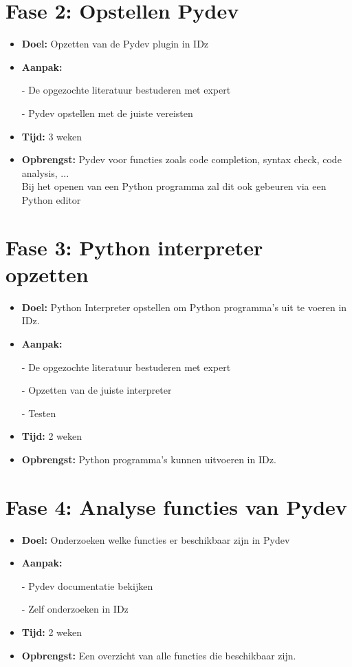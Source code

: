 \section{Fase 2: Opstellen Pydev}
\label{sec:m-opstellen-pydev}
\begin{itemize}
    \item \textbf{Doel:}
    Opzetten van de Pydev plugin in IDz
    \item \textbf{Aanpak:}
    \item[-] De opgezochte literatuur bestuderen met expert
    \item[-] Pydev opstellen met de juiste vereisten
    \item \textbf{Tijd:} 3 weken
    \item \textbf{Opbrengst:}
    Pydev voor functies zoals code completion, syntax check, code analysis, ... \\ 
    Bij het openen van een Python programma zal dit ook gebeuren via een Python editor
\end{itemize}


\section{Fase 3: Python interpreter opzetten}
\label{sec:m-python-interpreter-opzetten}
\begin{itemize}
    \item \textbf{Doel:}
    Python Interpreter opstellen om Python programma's uit te voeren in IDz.
    \item \textbf{Aanpak:}
    \item[-] De opgezochte literatuur bestuderen met expert
    \item[-] Opzetten van de juiste interpreter
    \item[-] Testen
    
    \item \textbf{Tijd:} 2 weken
    \item \textbf{Opbrengst:}
    Python programma's kunnen uitvoeren in IDz.
\end{itemize}


\section{Fase 4: Analyse functies van Pydev}
\label{sec:m-verdere-configuratie}
\begin{itemize}
    \item \textbf{Doel:}
    Onderzoeken welke functies er beschikbaar zijn in Pydev
    \item \textbf{Aanpak:}
    \item[-] Pydev documentatie bekijken
    \item[-] Zelf onderzoeken in IDz
    
    \item \textbf{Tijd:} 2 weken
    \item \textbf{Opbrengst:}
    Een overzicht van alle functies die beschikbaar zijn. 
\end{itemize}

